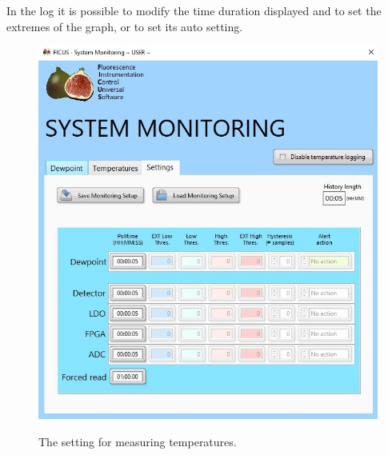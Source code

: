 \documentclass[a4paper,12pt,oneside,pdflatex,italian,final,twocolumn]{article}
\begin{document}
In the log it is possible to modify the time duration displayed and to set the extremes of the graph, or to set its auto setting.

\begin{figure}[h]
\centering
{\includegraphics[width=.45\textwidth]{Capture20.jpg}} \quad
\caption{The setting for measuring temperatures.}\label{fig:fig3}
\end{figure}
\end{document}
